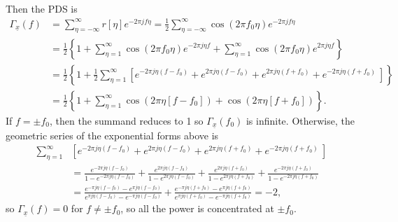 \documentclass{article}
\begin{document}
Then the PDS is
\begin{equation*}
\begin{split}
\Gamma_{\underline{x}}(f) 
  &= \sum_{\eta = -\infty}^{\infty} r[\eta] e^{-2 \pi j f \eta} 
   = \frac{1}{2} \sum_{\eta = -\infty}^{\infty} 
       \cos(2 \pi f_0 \eta) e^{-2\pi j f \eta} \\
  &= \frac{1}{2} \left\{1 
   + \sum_{\eta = 1}^{\infty}\cos(2 \pi f_0 \eta) e^{-2 \pi j \eta f}
   + \sum_{\eta = 1}^{\infty}\cos(2 \pi f_0 \eta) e^{2 \pi j \eta f}
     \right\} \\
  &= \frac{1}{2}\left\{1
   + \frac{1}{2}\sum_{\eta=1}^{\infty}\left[
       e^{-2 \pi j \eta (f - f_0)} + e^{2 \pi j \eta (f - f_0)}
     + e^{2 \pi j \eta (f + f_0)} + e^{-2 \pi j \eta (f + f_0)}\
                                      \right]\right\} \\
  &= \frac{1}{2}\left\{1
   + \sum_{\eta=1}^{\infty}
       \cos(2 \pi \eta [f-f_0]) + \cos(2 \pi \eta [f + f_0])\right\}.
\end{split}
\end{equation*}
If $f = \pm f_0$, then the summand reduces to 1 so 
$\Gamma_{\underline{x}}(f_0)$ is infinite. Otherwise, the geometric series
of the exponential forms above is
\begin{align*}
  \sum_{\eta=1}^{\infty}&\left[
     e^{-2 \pi j \eta (f - f_0)} + e^{2 \pi j \eta (f - f_0)}
   + e^{2 \pi j \eta (f + f_0)} + e^{-2 \pi j \eta (f + f_0)}\
                                      \right] \\
&= \frac{e^{-2 \pi j \eta (f-f_0)}}{1 - e^{-2 \pi j \eta (f-f_0)}}
 + \frac{e^{2 \pi j \eta(f-f_0)}}{1 - e^{2 \pi j \eta (f-f_0)}}
 + \frac{e^{2 \pi j \eta(f+f_0)}}{1 - e^{2 \pi j \eta (f+f_0)}}
 + \frac{e^{-2\pi j \eta(f+f_0)}}{1 - e^{-2\pi j \eta (f+f_0)}} \\
&= \frac{e^{-\pi j \eta (f-f_0)} - e^{\pi j \eta (f-f_0)}}
        {e^{\pi j \eta (f-f_0)} - e^{-\pi j \eta (f-f_0)}}
 + \frac{e^{-\pi j \eta (f+f_0)} - e^{\pi j \eta (f+f_0)}}
        {e^{\pi j \eta (f+f_0)} - e^{-\pi j \eta (f+f_0)}} = -2,
\end{align*}
so $\Gamma_{\underline{x}}(f) = 0$ for $f \neq \pm f_0$, so
all the power is concentrated at $\pm f_0$.
\end{document}
